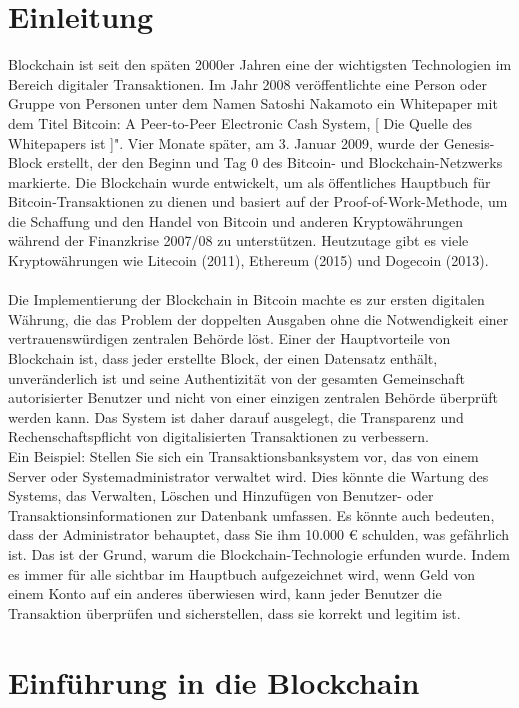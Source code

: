 \chapter{Einleitung}
Blockchain ist seit den späten 2000er Jahren eine der wichtigsten Technologien im Bereich digitaler Transaktionen. Im Jahr 2008 veröffentlichte eine Person oder Gruppe von Personen unter dem Namen Satoshi Nakamoto ein Whitepaper mit dem Titel \dq Bitcoin: A Peer-to-Peer Electronic Cash System\dq, [ Die Quelle des Whitepapers  ist \cite{nakamoto2008bitcoin} ]". Vier Monate später, am 3. Januar 2009, wurde der Genesis-Block erstellt, der den Beginn und Tag 0 des Bitcoin- und Blockchain-Netzwerks markierte. Die Blockchain wurde entwickelt, um als öffentliches Hauptbuch für Bitcoin-Transaktionen zu dienen und basiert auf der Proof-of-Work-Methode, um die Schaffung und den Handel von Bitcoin und anderen Kryptowährungen während der Finanzkrise 2007/08 zu unterstützen. Heutzutage gibt es viele Kryptowährungen wie Litecoin (2011), Ethereum (2015) und Dogecoin (2013).\\ \\
Die Implementierung der Blockchain in Bitcoin machte es zur ersten digitalen Währung, die das Problem der doppelten Ausgaben ohne die Notwendigkeit einer vertrauenswürdigen zentralen Behörde löst. Einer der Hauptvorteile von Blockchain ist, dass jeder erstellte Block, der einen Datensatz enthält, unveränderlich ist und seine Authentizität von der gesamten Gemeinschaft autorisierter Benutzer und nicht von einer einzigen zentralen Behörde überprüft werden kann. Das System ist daher darauf ausgelegt, die Transparenz und Rechenschaftspflicht von digitalisierten Transaktionen zu verbessern.\\
Ein Beispiel: Stellen Sie sich ein Transaktionsbanksystem vor, das von einem Server oder Systemadministrator verwaltet wird. Dies könnte die Wartung des Systems, das Verwalten, Löschen und Hinzufügen von Benutzer- oder Transaktionsinformationen zur Datenbank umfassen. Es könnte auch bedeuten, dass der Administrator behauptet, dass Sie ihm 10.000 € schulden, was gefährlich ist.
Das ist der Grund, warum die Blockchain-Technologie erfunden wurde. Indem es immer für alle sichtbar im Hauptbuch aufgezeichnet wird, wenn Geld von einem Konto auf ein anderes überwiesen wird, kann jeder Benutzer die Transaktion überprüfen und sicherstellen, dass sie korrekt und legitim ist. \\

\chapter{Einführung in die Blockchain}

